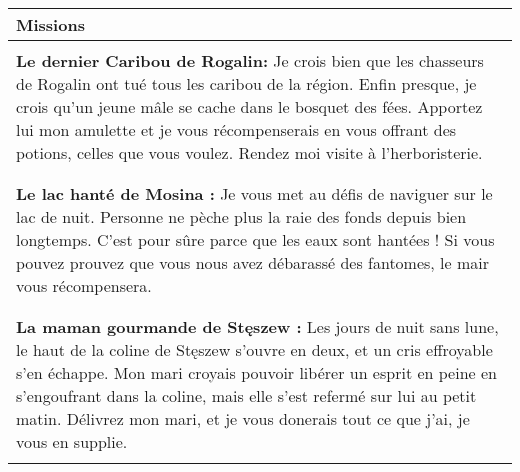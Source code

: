 \documentclass[11pt]{article} %
\begin{document}
\begin{tabularx}{\linewidth}{X}
\hline

    \textbf{Missions}
    \\\hline\\
    \textbf{Le dernier Caribou de Rogalin:}\newline
    Je crois bien que les chasseurs de Rogalin ont tué tous les caribou de la région. Enfin presque, je crois qu'un jeune mâle se cache dans le bosquet des fées. Apportez lui mon amulette et je vous récompenserais en vous offrant des potions, celles que vous voulez. Rendez moi visite à l'herboristerie.
    \\\\\hline\\
    \textbf{Le lac hanté de Mosina :}\newline
    Je vous met au défis de naviguer sur le lac de nuit. Personne ne pèche plus la raie des fonds depuis bien longtemps. C'est pour sûre parce que les  eaux sont hantées ! Si vous pouvez prouvez que vous nous avez débarassé des fantomes, le mair vous récompensera.\\\\\hline\\
    \textbf{La maman gourmande de Stęszew :}\newline
    Les jours de nuit sans lune, le haut de la coline de Stęszew s'ouvre en deux, et un cris effroyable s'en échappe. Mon mari croyais pouvoir libérer un esprit en peine en s'engoufrant dans la coline, mais elle s'est refermé sur lui au petit matin. Délivrez mon mari, et je vous donerais tout ce que j'ai, je vous en supplie.\\\\


\hline
\end{tabularx}
\end{document}
